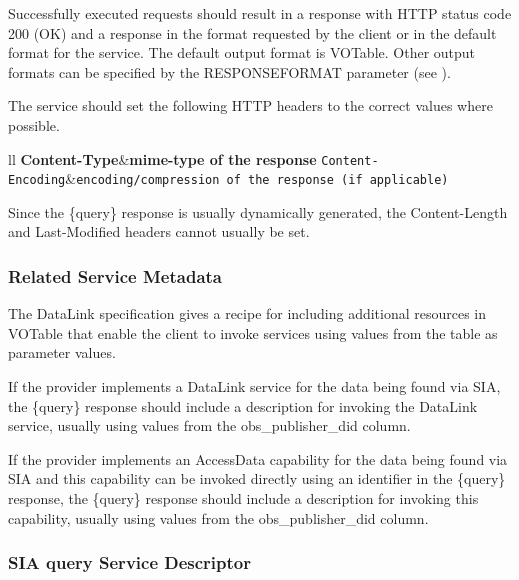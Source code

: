 \documentclass[11pt,a4paper]{ivoa}
\begin{document}
Successfully executed requests should result in a response with HTTP status code 200 (OK) and a response in the format requested by the client or in the default format for the service. The default output format is VOTable. Other output formats can be specified by the RESPONSEFORMAT parameter (see \citet{2017ivoa.spec.0517D}).

The service should set the following HTTP headers to the correct values where possible.
\begin{table}[H]
\begin{tabular}{ll}
\sptablerule
\textbf{Content-Type}&\textbf{mime-type of the response}\cr
\sptablerule
\texttt{Content-Encoding}&\texttt{encoding/compression of the response (if applicable)}\cr
\sptablerule
\end{tabular}
\caption{Recommended HTTP Response Headers}
\label{tab:RespHead}
\end{table}





Since the \{query\} response is usually dynamically generated, the Content-Length and Last-Modified headers cannot usually be set.

\subsubsection{Related Service Metadata}
The DataLink specification  gives a recipe for including additional resources in VOTable that enable the client to invoke services using values from the table as parameter values.

If the provider implements a DataLink service for the data being found via SIA, the \{query\} response should include a description for invoking the DataLink service, usually using values from the obs\_publisher\_did column.

If the provider implements an AccessData capability for the data being found via SIA and this capability can be invoked directly using an identifier in the \{query\} response, the \{query\} response should include a description for invoking this capability, usually using values from the obs\_publisher\_did column.



\subsubsection{SIA {query} Service Descriptor}
\end{document}
